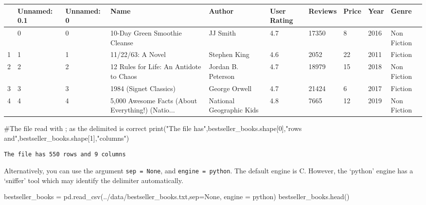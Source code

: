 \documentclass[
  letterpaper,
  DIV=11,
  numbers=noendperiod]{scrreprt}
\newenvironment{Shaded}{\begin{snugshade}}{\end{snugshade}}
\newcommand{\BuiltInTok}[1]{\textcolor[rgb]{0.00,0.23,0.31}{#1}}
\newcommand{\CommentTok}[1]{\textcolor[rgb]{0.37,0.37,0.37}{#1}}
\newcommand{\DecValTok}[1]{\textcolor[rgb]{0.68,0.00,0.00}{#1}}
\newcommand{\NormalTok}[1]{\textcolor[rgb]{0.00,0.23,0.31}{#1}}
\newcommand{\OperatorTok}[1]{\textcolor[rgb]{0.37,0.37,0.37}{#1}}
\newcommand{\StringTok}[1]{\textcolor[rgb]{0.13,0.47,0.30}{#1}}
\newcommand{\VariableTok}[1]{\textcolor[rgb]{0.07,0.07,0.07}{#1}}
\begin{document}
\begin{longtable}[]{@{}llllllllll@{}}
\toprule\noalign{}
& Unnamed: 0.1 & Unnamed: 0 & Name & Author & User Rating & Reviews &
Price & Year & Genre \\
\midrule\noalign{}
\endhead
\bottomrule\noalign{}
\endlastfoot
0 & 0 & 0 & 10-Day Green Smoothie Cleanse & JJ Smith & 4.7 & 17350 & 8 &
2016 & Non Fiction \\
1 & 1 & 1 & 11/22/63: A Novel & Stephen King & 4.6 & 2052 & 22 & 2011 &
Fiction \\
2 & 2 & 2 & 12 Rules for Life: An Antidote to Chaos & Jordan B. Peterson
& 4.7 & 18979 & 15 & 2018 & Non Fiction \\
3 & 3 & 3 & 1984 (Signet Classics) & George Orwell & 4.7 & 21424 & 6 &
2017 & Fiction \\
4 & 4 & 4 & 5,000 Awesome Facts (About Everything!) (Natio... & National
Geographic Kids & 4.8 & 7665 & 12 & 2019 & Non Fiction \\
\end{longtable}

\begin{Shaded}
\begin{Highlighting}[]
\CommentTok{\#The file read with \textquotesingle{};\textquotesingle{} as the delimited is correct}
\BuiltInTok{print}\NormalTok{(}\StringTok{"The file has"}\NormalTok{,bestseller\_books.shape[}\DecValTok{0}\NormalTok{],}\StringTok{"rows and"}\NormalTok{,bestseller\_books.shape[}\DecValTok{1}\NormalTok{],}\StringTok{"columns"}\NormalTok{)}
\end{Highlighting}
\end{Shaded}

\begin{verbatim}
The file has 550 rows and 9 columns
\end{verbatim}

Alternatively, you can use the argument \texttt{sep\ =\ None}, and
\texttt{engine\ =\ \textquotesingle{}python\textquotesingle{}}. The
default engine is C. However, the `python' engine has a `sniffer' tool
which may identify the delimiter automatically.

\begin{Shaded}
\begin{Highlighting}[]
\NormalTok{bestseller\_books }\OperatorTok{=}\NormalTok{ pd.read\_csv(}\StringTok{\textquotesingle{}../data/bestseller\_books.txt\textquotesingle{}}\NormalTok{,sep}\OperatorTok{=}\VariableTok{None}\NormalTok{, engine }\OperatorTok{=} \StringTok{\textquotesingle{}python\textquotesingle{}}\NormalTok{)}
\NormalTok{bestseller\_books.head()}
\end{Highlighting}
\end{Shaded}
\end{document}
